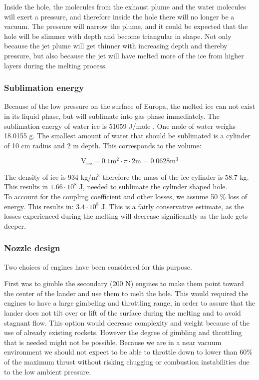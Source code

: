 Inside the hole, the molecules from the exhaust plume and the water molecules will exert a pressure, and therefore inside the hole there will no longer be a vacuum. The pressure will narrow the plume, and it could be expected that the hole will be slimmer with depth and become triangular in shape. Not only because the jet plume will get thinner with increasing depth and thereby pressure, but also because the jet will have melted more of the ice from higher layers during the melting process. 


\subsubsection{Sublimation energy}

Because of the low pressure on the surface of Europa, the melted ice can not exist in its liquid phase, but will sublimate into gas phase immediately. The sublimation energy of water ice is 51059 J/mole \cite{water_prop}. One mole of water weighs 18.0155 g. The smallest amount of water that should be sublimated is a cylinder of 10 cm radius and 2 m depth. This corresponds to the volume:

\begin{equation}
\mathrm{V_{ice}}=0.1 \mathrm{m}^2 \cdot \pi \cdot 2 \mathrm{m} = 0.0628 \mathrm{m}^3
\end{equation}

The density of ice is 934 kg/m$^3$ therefore the mass of the ice cylinder is 58.7 kg. This results in $1.66\cdot 10^8$ J, needed to sublimate the cylinder shaped hole. \\

To account for the coupling coefficient and other losses, we assume 50 \% loss of energy. This results in: $3.4 \cdot 10^8$ J. This is a fairly conservative estimate, as the losses experienced during the melting will decrease significantly as the hole gets deeper. 




\subsubsection{Nozzle design}

Two choices of engines have been considered for this purpose. 

First was to gimble the secondary (200 N) engines to make them point toward the center of the lander and use them to melt the hole. This would required the engines to have a large gimbeling and throttling range, in order to assure that the lander does not tilt over or lift of the surface during the melting and to avoid stagnant flow. This option would decrease complexity and weight because of the use of already existing rockets. However the degree of gimbling and throttling that is needed might not be possible. Because we are in a near vacuum environment we should not expect to be able to throttle down to lower than 60\% of the maximum thrust without risking chugging or combustion instabilities due to the low ambient pressure.

